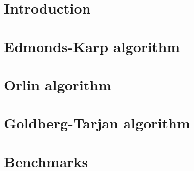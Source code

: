 \documentclass{report}
\author{}
\date{\today{}}
\begin{document}

\pagebreak

\tableofcontents

\pagebreak

\chapter{Introduction}

% 
\chapter{Edmonds-Karp algorithm}
 

% 
\chapter{Orlin algorithm}


\chapter{Goldberg-Tarjan algorithm}


\chapter{Benchmarks}

\printbibliography
\end{document}
